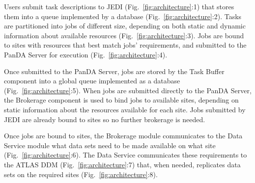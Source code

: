 

Users submit task descriptions to JEDI (Fig.~\ref{fig:architecture}:1) that
stores them into a queue implemented by a database
(Fig.~\ref{fig:architecture}:2). Tasks are partitioned into jobs of different
size, depending on both static and dynamic information about available
resources (Fig.~\ref{fig:architecture}:3). Jobs are bound to sites with
resources that best match jobs' requirements, and submitted to the PanDA
Server for execution (Fig.~\ref{fig:architecture}:4).

Once submitted to the PanDA Server, jobs are stored by the Task Buffer
component into a global queue implemented as a database
(Fig.~\ref{fig:architecture}:5). When jobs are submitted directly to the
PanDA Server, the Brokerage component is used to bind jobs to available
sites, depending on static information about the resources available for each
site. Jobs submitted by JEDI are already bound to sites so no further
brokerage is needed.

Once jobs are bound to sites, the Brokerage module communicates to the Data
Service module what data sets need to be made available on what site
(Fig.~\ref{fig:architecture}:6). The Data Service communicates these
requirements to the ATLAS DDM (Fig.~\ref{fig:architecture}:7) that, when
needed, replicates data sets on the required sites
(Fig.~\ref{fig:architecture}:8).

